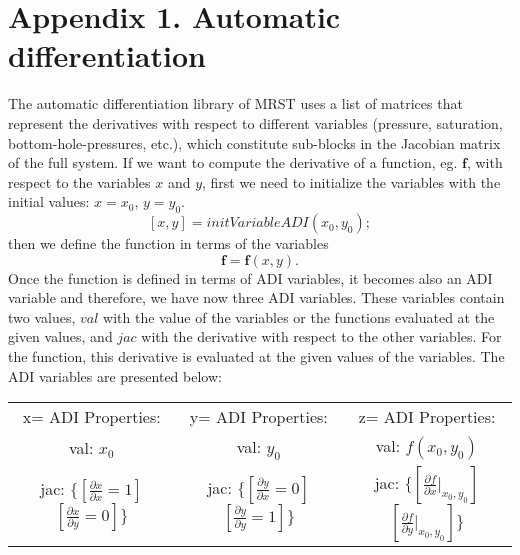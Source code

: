 \documentclass[12pt]{report}
\begin{document}
% 
\newpage
\appendix
\section*{Appendix 1. Automatic differentiation}\label{a1}
The automatic differentiation library of MRST uses a list of matrices that represent the derivatives
with respect to different variables (pressure, saturation, bottom-hole-pressures, etc.), 
which constitute sub-blocks in the Jacobian matrix of the full system.
If we want to compute the derivative of a function, eg. $ \mathbf{f}$, with respect to the variables $x$ and $y$, 
first we need to initialize the variables with the initial values: $x=x_0$, $y=y_0$.
$$[x,y]=initVariableADI(x_0,y_0);$$
then we define the function in terms of the variables
$$ \mathbf{f}= \mathbf{f}(x,y).$$
Once the function is defined in terms of ADI variables, it becomes also an ADI variable and therefore, we have now 
three ADI variables. These variables contain two values, $val$ with the value of the variables 
or the functions evaluated at the given values, and $jac$ with the derivative with respect to the 
other variables. 
For the function, this derivative is evaluated at the given values of the variables. The ADI variables are
presented below:
\begin{table}[!ht]
\centering
\begin{tabular}{ |c c c|} 
\hline
x= ADI Properties:  & y= ADI Properties: &z= ADI Properties:\\ 
  val: $x_0$ & val: $y_0$ &val: $f(x_0,y_0)$\\ 
  jac: $\{[\frac{\partial x}{\partial x}=1]$   $[\frac{\partial x}{\partial y}=0]\}$ &
  jac: $\{[\frac{\partial y}{\partial x}=0]$  $[\frac{\partial y}{\partial y}=1]\}$&
  jac: $\{[\frac{\partial f}{\partial x}|_{x_0,y_0}]$  $[\frac{\partial f}{\partial y}|_{x_0,y_0}]\}$\\ 
 \hline
\end{tabular}
\label{table:POD15spe}
\end{table}  
\end{document}
